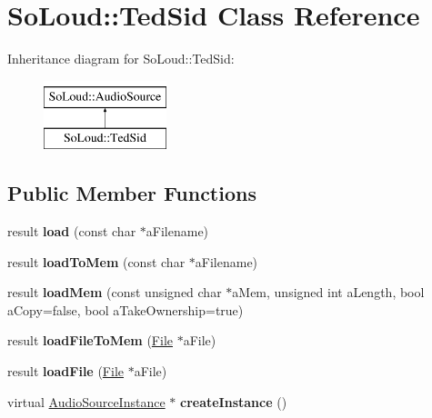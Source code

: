 \hypertarget{class_so_loud_1_1_ted_sid}{}\section{So\+Loud\+::Ted\+Sid Class Reference}
\label{class_so_loud_1_1_ted_sid}
Inheritance diagram for So\+Loud\+::Ted\+Sid\+:\begin{figure}[H]
\begin{center}
\leavevmode
\includegraphics[height=2.000000cm]{class_so_loud_1_1_ted_sid}
\end{center}
\end{figure}
\subsection*{Public Member Functions}
\begin{DoxyCompactItemize}
\item 
\mbox{\label{class_so_loud_1_1_ted_sid_a743a333fb6753425fd5a2924075ce218}} 
result {\bfseries load} (const char $\ast$a\+Filename)
\item 
\mbox{\label{class_so_loud_1_1_ted_sid_aef8596ef56e42fe59903dd536116d9bd}} 
result {\bfseries load\+To\+Mem} (const char $\ast$a\+Filename)
\item 
\mbox{\label{class_so_loud_1_1_ted_sid_aa1d45d8ef564e68e0e1fc0b128ec5dbd}} 
result {\bfseries load\+Mem} (const unsigned char $\ast$a\+Mem, unsigned int a\+Length, bool a\+Copy=false, bool a\+Take\+Ownership=true)
\item 
\mbox{\label{class_so_loud_1_1_ted_sid_a23705859dbe64f44224ac9b8f7648976}} 
result {\bfseries load\+File\+To\+Mem} (\mbox{\hyperlink{class_so_loud_1_1_file}{File}} $\ast$a\+File)
\item 
\mbox{\label{class_so_loud_1_1_ted_sid_a1de39e8535fedd4a799d7a8a0e5faf69}} 
result {\bfseries load\+File} (\mbox{\hyperlink{class_so_loud_1_1_file}{File}} $\ast$a\+File)
\item 
\mbox{\label{class_so_loud_1_1_ted_sid_ac5bff713f155c4546b9c16adce8f1868}} 
virtual \mbox{\hyperlink{class_so_loud_1_1_audio_source_instance}{Audio\+Source\+Instance}} $\ast$ {\bfseries create\+Instance} ()
\end{DoxyCompactItemize}
